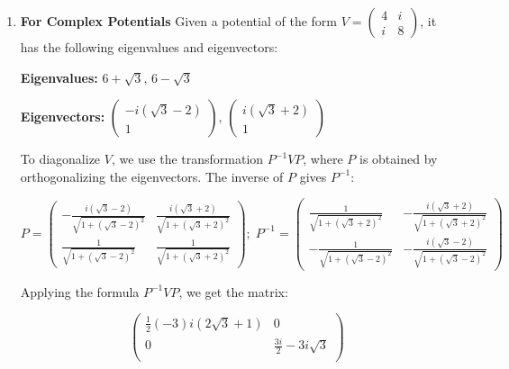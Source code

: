 \documentclass[a4paper, 12pt]{article}
\begin{document}
\begin{enumerate}
{\begin{enumerate}
    Applying the formula \(P^{-1}.V.P\), we get:

    \[\begin{bmatrix} \sqrt{5}+6 & 0 \\ 0 & 6-\sqrt{5} \end{bmatrix}\]

    Therefore, the matrix is diagonalized.

    \item {\bf For Complex Potentials}
    Given a potential of the form $V = \begin{pmatrix} 4 & i \\ i & 8 \end{pmatrix}$, it has the following eigenvalues and eigenvectors:

    \textbf{Eigenvalues:} $6 + \sqrt{3}, \, 6 - \sqrt{3}$

    \textbf{Eigenvectors:} $\begin{pmatrix} -i \left(\sqrt{3}-2\right) \\ 1 \end{pmatrix}, \, \begin{pmatrix} i \left(\sqrt{3}+2\right) \\ 1 \end{pmatrix}$

    To diagonalize $V$, we use the transformation $P^{-1}VP$, where $P$ is obtained by orthogonalizing the eigenvectors. The inverse of $P$ gives $P^{-1}$:

    \[ P = \begin{pmatrix} -\frac{i \left(\sqrt{3}-2\right)}{\sqrt{1+\left(\sqrt{3}-2\right)^2}} & \frac{i \left(\sqrt{3}+2\right)}{\sqrt{1+\left(\sqrt{3}+2\right)^2}} \\ \frac{1}{\sqrt{1+\left(\sqrt{3}-2\right)^2}} & \frac{1}{\sqrt{1+\left(\sqrt{3}+2\right)^2}}\end{pmatrix} ;\; P^{-1} = \begin{pmatrix} \frac{1}{\sqrt{1+\left(\sqrt{3}+2\right)^2}} & -\frac{i \left(\sqrt{3}+2\right)}{\sqrt{1+\left(\sqrt{3}+2\right)^2}} \\ -\frac{1}{\sqrt{1+\left(\sqrt{3}-2\right)^2}} & -\frac{i \left(\sqrt{3}-2\right)}{\sqrt{1+\left(\sqrt{3}-2\right)^2}} \end{pmatrix} \]

    Applying the formula $P^{-1}VP$, we get the matrix:

    \[ \left(
        \begin{array}{cc}
         \frac{1}{2} (-3) i \left(2 \sqrt{3}+1\right) & 0 \\
         0 & \frac{3 i}{2}-3 i \sqrt{3} \\
        \end{array}
        \right) \]


\end{enumerate}}
\end{enumerate}
\end{document}
